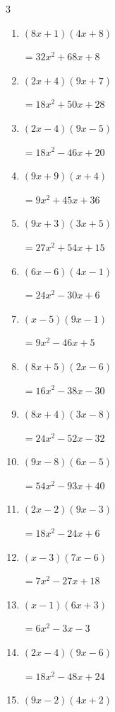 \begin{multicols}{3}
\begin{enumerate}
        $=48x^{2}-50x+12$

\columnbreak %

  \item $(8x+1)(4x+8)$

        $=32x^{2}+68x+8$

  \item $(2x+4)(9x+7)$

        $=18x^{2}+50x+28$

  \item $(2x-4)(9x-5)$

        $=18x^{2}-46x+20$

  \item $(9x+9)(x+4)$

        $=9x^{2}+45x+36$

  \item $(9x+3)(3x+5)$

        $=27x^{2}+54x+15$

  \item $(6x-6)(4x-1)$

        $=24x^{2}-30x+6$

  \item $(x-5)(9x-1)$

        $=9x^{2}-46x+5$

  \item $(8x+5)(2x-6)$

        $=16x^{2}-38x-30$

  \item $(8x+4)(3x-8)$

        $=24x^{2}-52x-32$

  \item $(9x-8)(6x-5)$

        $=54x^{2}-93x+40$

  \item $(2x-2)(9x-3)$

        $=18x^{2}-24x+6$

  \item $(x-3)(7x-6)$

        $=7x^{2}-27x+18$

  \item $(x-1)(6x+3)$

        $=6x^{2}-3x-3$

  \item $(2x-4)(9x-6)$

        $=18x^{2}-48x+24$

  \item $(9x-2)(4x+2)$


\end{enumerate}
\end{multicols}

